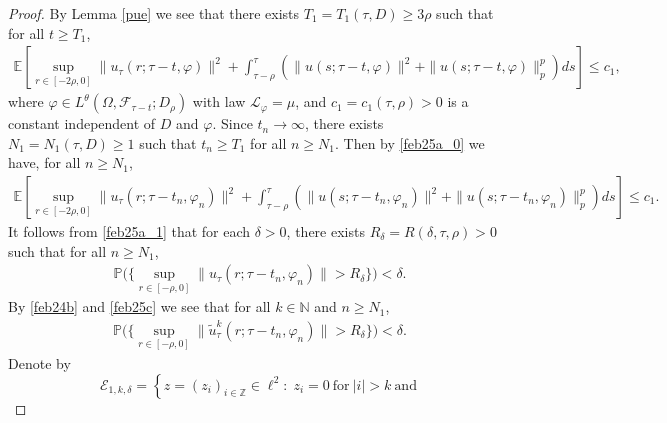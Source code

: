 \documentclass[11pt]{article}
\numberwithin{equation}{section}
\theoremstyle{plain}
\begin{document}
\begin{proof}
 By
  Lemma \ref{pue}  we see 
  that  there exists $T_1 =T_1 (\tau, D) \ge 3\rho$
  such that for all $t\ge T_1$,
 \begin{align} \label{feb25a_0}
       \mathbb{E}
              \left[ \sup_{ r \in [-2\rho, 0]} 
                          \| u_\tau(r; \tau-t, \varphi) \|^2 
                      + \int^\tau_{\tau - \rho}
                             ( \| u(s; \tau-t, \varphi)\|^2  
                               + \| u(s; \tau-t, \varphi)\|^p_p
                              ) ds 
              \right]
       \le c_1,
 \end{align}
 where $\varphi \in L^{\theta}(\Omega, \mathcal{F}_{\tau-t}; D_{\rho})$ with  law $\mathcal{L}_{\varphi} = \mu$, and 
 $c_1= c_1(\tau, \rho)>0$ is a constant
 independent of $D$ and 
 $ \varphi$.
 Since $t_n \to \infty$,
 there exists $N_1 =N_1(\tau, D)\ge 1$ such that
 $t_n \ge T_1$ for all $n\ge N_1$.
 Then by \eqref{feb25a_0} we have,
 for all $n\ge N_1$,
 \begin{align} \label{feb25a_1}
   \mathbb{E}
          \left[ \sup_{ r \in [-2\rho, 0]} 
                          \|  u_\tau(r; \tau-t_n, \varphi_n) \|^2 
                   + \int^\tau_{\tau - \rho}
                          ( \| u(s; \tau-t_n, \varphi_n) \|^2  
                             + \| u(s; \tau-t_n, \varphi_n)\|^p_p
                           ) ds
         \right]
   \le c_1.
\end{align}
 It follows from \eqref{feb25a_1}
 that
  for 
 each  $\delta > 0$,
  there exists  $R_{
 \delta} = R(\delta, \tau, \rho) > 0$
 such that
  for all $n\ge N_1$,
 \begin{align}\label{feb25c}
    \mathbb{P}
       \Big(
            \big\{ \sup_{ r \in [-\rho, 0]} 
                          \|  {u}_\tau(r; \tau-t_n, \varphi_n)\|
                       > R_{\delta}
           \big\}
       \Big)
   <  \delta. 
 \end{align}
 By \eqref{feb24b} and \eqref{feb25c} we see that
 for all  $k\in \mathbb{N}$ and $n\ge N_1$,
 \begin{align}\label{feb25d}
    \mathbb{P}
       \Big(
            \big\{ \sup_{ r \in [-\rho, 0]} 
                          \|  \widetilde{u}
                          ^k_\tau(r; \tau-t_n, \varphi_n)\|
                       > R_{\delta}
           \big\}
       \Big)
   <  \delta. 
 \end{align}
 Denote by
 $$ \mathcal{E}_{1, k, \delta}
 =   \left\{ z =(z_i)_{i\in
 \mathbb{Z}}
  \in \ell^2 : \; 
                    z_i = 0 \  \text{for} \ | i | >  k
                    \  \text{and} \
$$
\end{proof}
\end{document}
